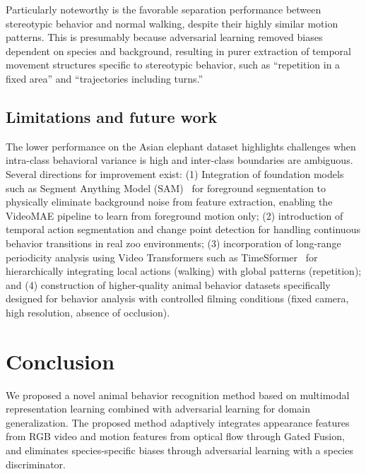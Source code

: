 \documentclass[twocolumn]{svjour3}
\begin{document}
Particularly noteworthy is the favorable separation performance between stereotypic behavior and normal walking, despite their highly similar motion patterns.
This is presumably because adversarial learning removed biases dependent on species and background, resulting in purer extraction of temporal movement structures specific to stereotypic behavior, such as ``repetition in a fixed area'' and ``trajectories including turns.''

\subsection{Limitations and future work}

The lower performance on the Asian elephant dataset highlights challenges when intra-class behavioral variance is high and inter-class boundaries are ambiguous.
Several directions for improvement exist:
(1) Integration of foundation models such as Segment Anything Model (SAM)~\cite{kirillov2023segment} for foreground segmentation to physically eliminate background noise from feature extraction, enabling the VideoMAE pipeline to learn from foreground motion only;
(2) introduction of temporal action segmentation and change point detection for handling continuous behavior transitions in real zoo environments;
(3) incorporation of long-range periodicity analysis using Video Transformers such as TimeSformer~\cite{bertasius2021space} for hierarchically integrating local actions (walking) with global patterns (repetition);
and (4) construction of higher-quality animal behavior datasets specifically designed for behavior analysis with controlled filming conditions (fixed camera, high resolution, absence of occlusion).

\section{Conclusion}
\label{sec:conclusion}

We proposed a novel animal behavior recognition method based on multimodal representation learning combined with adversarial learning for domain generalization.
The proposed method adaptively integrates appearance features from RGB video and motion features from optical flow through Gated Fusion, and eliminates species-specific biases through adversarial learning with a species discriminator.
\end{document}

